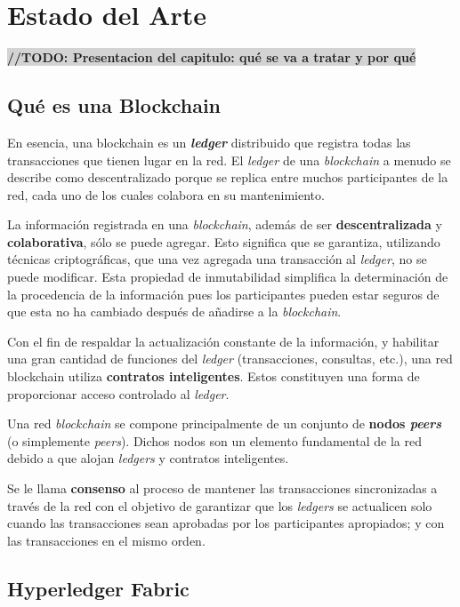 \chapter{Estado del Arte}\label{chapter:state-of-the-art}


\colorbox{lightgray}{\textbf{//TODO: Presentacion del capitulo: qué se va a tratar y por qué}}

\section{Qué es una Blockchain}
En esencia, una blockchain es un \textbf{\textit{ledger}} distribuido que registra todas las transacciones que tienen lugar en la red. El \textit{ledger} de una \textit{blockchain} a menudo se describe como descentralizado porque se replica entre muchos participantes de la red, cada uno de los cuales colabora en su mantenimiento.

La información registrada en una \textit{blockchain}, además de ser \textbf{descentralizada} y \textbf{colaborativa}, sólo se puede agregar. Esto significa que se garantiza, utilizando técnicas criptográficas, que una vez  agregada una transacción al \textit{ledger}, no se puede modificar. Esta propiedad de inmutabilidad simplifica la determinación de la procedencia de la información pues los participantes pueden estar seguros de que esta no ha cambiado después de añadirse a la \textit{blockchain}.

Con el fin de respaldar la actualización constante de la información, y  habilitar una gran cantidad de funciones del \textit{ledger} (transacciones, consultas, etc.), una red  blockchain utiliza \textbf{contratos inteligentes}. Estos constituyen una forma de proporcionar acceso controlado al \textit{ledger}.

Una red  \textit{blockchain} se compone principalmente de un conjunto de \textbf{nodos \textit{peers}} (o simplemente \textit{peers}). Dichos nodos son un elemento fundamental de la red debido a que alojan \textit{ledgers} y contratos inteligentes.

Se le llama \textbf{consenso} al proceso de mantener las transacciones sincronizadas a través de la red con el objetivo de garantizar que los \textit{ledgers} se actualicen solo cuando las transacciones sean aprobadas por los participantes apropiados; y con las transacciones en el mismo orden.

\section{Hyperledger Fabric}

